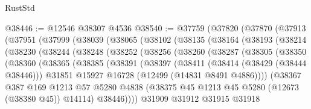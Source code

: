 \begin{lexlean}{RustStd}
\begin{coremodule}
{\begin{coremodule}
{{{{{{{{{{{{{{{{{{{{{{{{{{{{{{{{{{{{{{{{{{{{{{{{{{{{{{{{{{{{{{{{{{{{{{{{{{{{{{{{@38446 := @12546 @38307 @4536
@38540 := @37759
    (@37820
      (@37870
        (@37913
          (@37951
            (@37999
              (@38039
                (@38065
                  (@38102
                    (@38135
                      (@38164
                        (@38193
                          (@38214
                            (@38230
                              (@38244
                                (@38248
                                  (@38252
                                    (@38256
                                      (@38260
                                        (@38287
                                          (@38305
                                            (@38350
                                              (@38360
                                                (@38365
                                                  (@38385
                                                    (@38391
                                                      (@38397
                                                        (@38411
                                                          (@38414 (@38429 (@38444 @38446)))
                                                          @31851
                                                          @15927
                                                          @16728
                                                          (@12499 (@14831 @8491 @4886))))
                                                      (@38367
                                                        @387
                                                        @169
                                                        @1213
                                                        @57
                                                        @5280
                                                        @4838
                                                        (@38375
                                                          @45
                                                          @1213
                                                          @45
                                                          @5280
                                                          (@12673 (@38380 @45))
                                                          @14114)
                                                        @38446))))
                                                @31909
                                                @31912
                                                @31915
                                                @31918
}}}}}}}}}}}}}}}}}}}}}}}}}}}}}}}}}}}}}}}}}}}}}}}}}}}}}}}}}}}}}}}}}}}}}}}}}}}}}}}}
\end{coremodule}}
\end{coremodule}
\end{lexlean}

